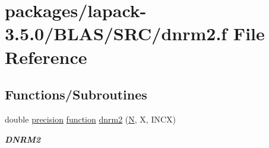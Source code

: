 \hypertarget{lapack-3_85_80_2BLAS_2SRC_2dnrm2_8f}{}\section{packages/lapack-\/3.5.0/\+B\+L\+A\+S/\+S\+R\+C/dnrm2.f File Reference}
\label{lapack-3_85_80_2BLAS_2SRC_2dnrm2_8f}
\subsection*{Functions/\+Subroutines}
\begin{DoxyCompactItemize}
\item 
double \hyperlink{numinquire_8h_a2c8e616467665d0b2814d4c1589ba74e}{precision} \hyperlink{afunc_8m_a7b5e596df91eadea6c537c0825e894a7}{function} \hyperlink{group__double__blas__level1_ga4b25c539b862414e6f91ebb30b391d7c}{dnrm2} (\hyperlink{polmisc_8c_a0240ac851181b84ac374872dc5434ee4}{N}, X, I\+N\+C\+X)
\begin{DoxyCompactList}\small\item\em {\bfseries D\+N\+R\+M2} \end{DoxyCompactList}\end{DoxyCompactItemize}
